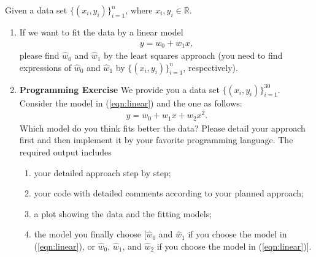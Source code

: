 \documentclass[11pt,letter,notitlepage]{article}
\begin{document}
\begin{exercise}
	Given a data set $\{ (x_i ,y_i) \}_{i=1}^{n}$, where $x_i,y_i\in \mathbb{R}$. 
	\begin{enumerate}
	    \item If we want to fit the data by a linear model
	        \begin{align}\label{eqn:linear}
	            y =  w_0 + w_1 x,
	        \end{align}
	        please find $\hat{w}_0$ and $\hat{w}_1$ by the least squares approach (you need to find expressions of $\hat{w}_0$ and $\hat{w}_1$ by $\{ (x_i ,y_i) \}_{i=1}^{n}$, respectively).
	    \item \textbf{Programming Exercise} We provide you a data set $\{ (x_i ,y_i) \}_{i=1}^{30}$. Consider the model in (\ref{eqn:linear}) and the one as follows:
	        \begin{align}\label{eqn:linear-quadratic}
	            y =  w_0 + w_1 x+ w_2 x^2. 
	        \end{align}
	        Which model do you think fits better the data? Please detail your approach first and then implement it by your favorite programming language. The required output includes 
	        \begin{enumerate}
	            \item your detailed approach step by step; 
	            \item your code with detailed comments according to your planned approach; 
	            \item a plot showing the data and the fitting models; 
	            \item the model you finally choose [$\hat{w}_0$ and $\hat{w}_1$ if you choose the model in (\ref{eqn:linear}), or $\hat{w}_0$, $\hat{w}_1$, and $\hat{w}_2$ if you choose the model in (\ref{eqn:linear})].
	        \end{enumerate}
	\end{enumerate}
\end{exercise}
\newpage
\end{document}
